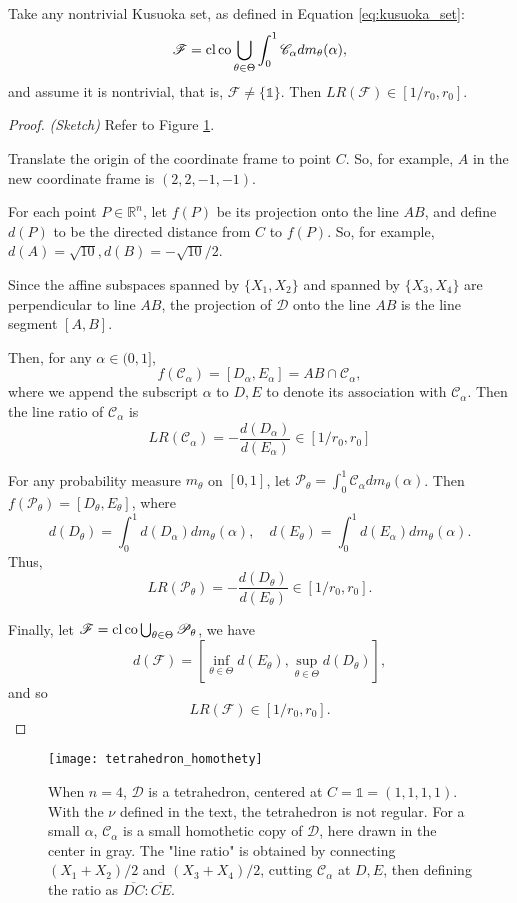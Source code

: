 \begin{prop}
Take any nontrivial Kusuoka set, as defined in Equation \ref{eq:kusuoka_set}:
$$
\mathscr{F} = \operatorname*{cl}\operatorname*{co}\bigcup_{\theta \in \Theta}\int_0^1 \mathscr{C}_\alpha dm_\theta(\alpha),
$$
and assume it is nontrivial, that is, $\mathscr{F}\neq \{\mathds{1}\}$. Then $LR(\mathscr{F}) \in [1/r_0, r_0]$.
\end{prop}
\begin{proof}\textit{(Sketch)} Refer to Figure \ref{fig:tetrahedron_homothety}.

	Translate the origin of the coordinate frame to point $C$. So, for example, $A$ in the new coordinate frame is $(2,2,-1,-1)$.
	
	For each point $P\in\mathbb{R}^n$, let $f(P)$ be its projection onto the line $AB$, and define $d(P)$ to be the directed distance from $C$ to $f(P)$. So, for example, $d(A) = \sqrt{10}, d(B) = -\sqrt{10}/2$.
	
	Since the affine subspaces spanned by $\{X_1, X_2\}$ and spanned by $\{X_3, X_4\}$ are perpendicular to line $AB$, the projection of $\mathscr{D}$ onto the line $AB$ is the line segment $[A,B]$.
	
	Then, for any $\alpha \in (0, 1]$, 
	$$f(\mathscr{C}_\alpha) = [D_\alpha, E_\alpha] = AB \cap \mathscr{C}_\alpha,$$
	where we append the subscript $\alpha$ to $D, E$ to denote its association with $\mathscr{C}_\alpha$. Then the line ratio of $\mathscr{C}_\alpha$ is 
	$$LR(\mathscr{C}_\alpha) = -\frac{d(D_\alpha)}{d(E_\alpha)}\in[1/r_0, r_0]$$
	
	For any probability measure $m_\theta$ on $[0, 1]$, let $\mathscr{P}_\theta = \int_0^1 \mathscr{C}_\alpha dm_\theta(\alpha)$. Then $f(\mathscr{P}_\theta) = [D_\theta, E_\theta]$, where 
	$$d(D_\theta) = \int_0^1 d(D_\alpha) dm_\theta(\alpha), \quad d(E_\theta) = \int_0^1 d(E_\alpha) dm_\theta(\alpha).$$
	Thus, 
	$$LR(\mathscr{P}_\theta) = -\frac{d(D_\theta)}{d(E_\theta)}\in[1/r_0, r_0].$$
	
	Finally, let $\mathscr{F} = \operatorname*{cl}\operatorname*{co}\bigcup_{\theta \in \Theta}\mathscr{P}_\theta$, we have
	$$d(\mathscr{F}) = \left[\inf_{\theta \in \Theta} d(E_\theta), \sup_{\theta \in \Theta} d(D_\theta)\right],$$
	and so
	$$LR(\mathscr{F}) \in [1/r_0, r_0].$$
\end{proof}


\begin{figure}[h]
	\centering
	\texttt{[image: tetrahedron\_homothety]}
	\caption{When \(n = 4\), \(\mathscr{D}\) is a tetrahedron, centered at \(C = \mathds{1} = (1,1,1,1)\). With the \(\nu\) defined in the text, the tetrahedron is not regular. For a small \(\alpha\), \(\mathscr{C}_\alpha\) is a small homothetic copy of \(\mathscr{D}\), here drawn in the center in gray. The "line ratio" is obtained by connecting \((X_1 + X_2)/2\) and \((X_3 + X_4)/2\), cutting \(\mathscr{C}_\alpha\) at \(D, E\), then defining the ratio as \(\overline{DC} : \overline{CE}\).}
	\label{fig:tetrahedron_homothety}
\end{figure}

